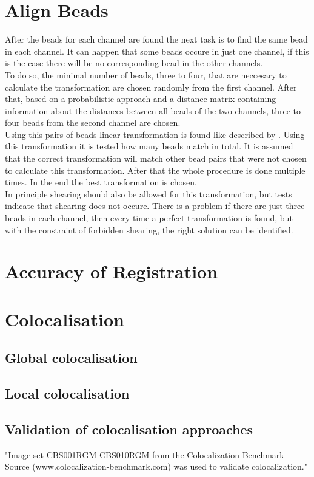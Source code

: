 \section{Align Beads}
After the beads for each channel are found the next task is to find the same
bead in each channel. It can happen that some beads occure in just one channel,
if this is the case there will be no corresponding bead in the other
channels.\\
To do so, the minimal number of beads, three to four, that are neccesary to
calculate the transformation are chosen randomly from the first channel. After that, based on
a probabilistic approach and a distance matrix containing information about the
distances between all beads of the two channels, three to four beads from the
second channel are chosen.\\
Using this pairs of beads linear transformation is found like described by
\cite{MAJoachim}. Using this transformation it is tested how many beads match in
total. It is assumed that the correct transformation will match other bead pairs
that were not chosen to calculate this transformation. After that the whole
procedure is done multiple times. In the end the best transformation is
chosen.\\
In principle shearing should also be allowed for this transformation, but tests
indicate that shearing does not occure. There is a problem if there are just
three beads in each channel, then every time a perfect transformation is found,
but with the constraint of forbidden shearing, the right solution can be
identified.

\section{Accuracy of Registration}

\section{Colocalisation}
\subsection{Global colocalisation}
\subsection{Local colocalisation}
\subsection{Validation of colocalisation approaches}
"Image set CBS001RGM-CBS010RGM from the Colocalization Benchmark Source
(www.colocalization-benchmark.com) was used to validate colocalization."
